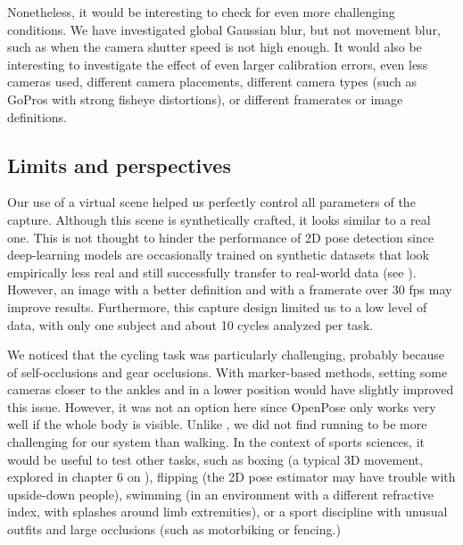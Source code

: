 Nonetheless, it would be interesting to check for even more challenging conditions. We have investigated global Gaussian blur, but not movement blur, such as when the camera shutter speed is not high enough. It would also be interesting to investigate the effect of even larger calibration errors, even less cameras used, different camera placements, different camera types (such as GoPros with strong fisheye distortions), or different framerates or image definitions.


\subsection{Limits and perspectives}

Our use of a virtual scene helped us perfectly control all parameters of the capture. Although this scene is synthetically crafted, it looks similar to a real one. This is not thought to hinder the performance of 2D pose detection since deep-learning models are occasionally trained on synthetic datasets that look empirically less real and still successfully transfer to real-world data (see \cite{Nikolenko2021,Patel2021,Wood2021,Bolanos2021,Varol2017}). However, an image with a better definition and with a framerate over 30 fps may improve results. Furthermore, this capture design limited us to a low level of data, with only one subject and about 10 cycles analyzed per task.

We noticed that the cycling task was particularly challenging, probably because of self-occlusions and gear occlusions. With marker-based methods, setting some cameras closer to the ankles and in a lower position would have slightly improved this issue. However, it was not an option here since OpenPose only works very well if the whole body is visible. Unlike \cite{D'Antonio2021}, we did not find running to be more challenging for our system than walking. In the context of sports sciences, it would be useful to test other tasks, such as boxing (a typical 3D movement, explored in chapter 6 on  \cite{Pagnon2022c}), flipping (the 2D pose estimator may have trouble with upside-down people), swimming (in an environment with a different refractive index, with splashes around limb extremities), or a sport discipline with unusual outfits and large occlusions (such as motorbiking or fencing.)

